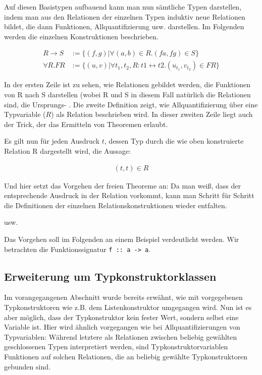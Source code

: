 \documentclass[11pt]{article} %
\begin{document}
Auf diesen Basistypen aufbauend kann man nun sämtliche Typen darstellen, indem man aus den Relationen der einzelnen Typen
induktiv neue Relationen bildet, die dann Funktionen, Allquantifizierung usw. darstellen. Im Folgenden werden die einzelnen
Konstruktionen beschrieben. \cite{voigtlander}

\begin{align}
R \rightarrow S & := \{ (f, g) | \forall (a, b) \in R. (f a, f g) \in S \} \\
\forall R . F R & := \{ (u, v) | \forall t_1, t_2, R : t1 \leftrightarrow t2 . (u_{t_1}, v_{t_2}) \in F R\}
\end{align}

In der ersten Zeile ist zu sehen, wie Relationen gebildet werden, die Funktionen von R nach S darstellen (wobei R und S in diesem
Fall natürlich die Relationen sind, die Ursprungs- . Die zweite Definition zeigt, wie Allquantifizierung über eine Typvariable ($R$) als Relation beschrieben wird. In dieser zweiten Zeile liegt auch der Trick, der das Ermitteln von Theoremen erlaubt.


Es gilt nun für jeden Ausdruck $t$, dessen Typ durch die wie oben konstruierte Relation R dargestellt wird,  die Aussage:

\begin{align*}
   (t, t) \in R
\end{align*}

Und hier setzt das Vorgehen der freien Theoreme an: Da man weiß, dass der entsprechende Ausdruck in der Relation
vorkommt, kann man Schritt für Schritt die Definitionen der einzelnen Relationskonstruktionen wieder entfalten.


usw.

Das Vorgehen soll im Folgenden an einem Beispiel verdeutlicht werden. Wir betrachten die Funktionssignatur \texttt{f :: a -> a}.

\subsection{Erweiterung um Typkonstruktorklassen}

Im vorangegangenen Abschnitt wurde bereits erwähnt, wie mit vorgegebenen Typkonstruktoren wie z.B. dem Listenkonstruktor
umgegangen wird. 
Nun ist es aber möglich, dass der Typkonstruktor kein fester Wert, sondern selbst eine Variable ist. Hier wird ähnlich vorgegangen wie bei
Allquantifizierungen von Typvariablen: Während letztere als Relationen zwischen beliebig gewählten geschlossenen Typen interpretiert werden, sind Typkonstruktorvariablen Funktionen auf solchen Relationen, die an beliebig gewählte Typkonstruktoren
gebunden sind.
\end{document}
